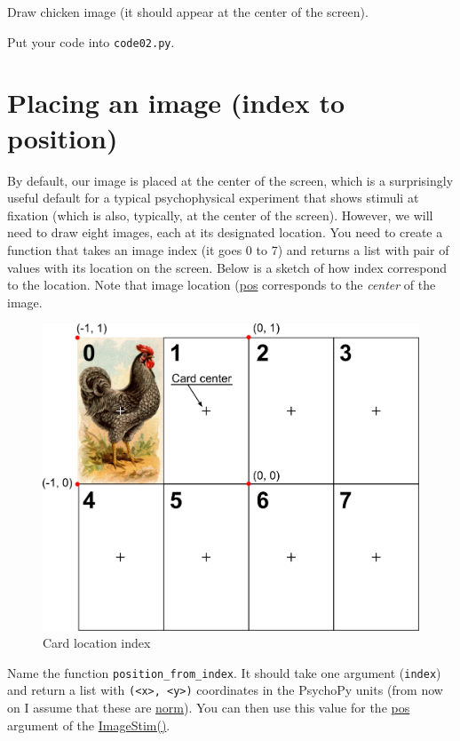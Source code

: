 \documentclass[
]{book}
\begin{document}
Draw chicken image (it should appear at the center of the screen).

Put your code into \texttt{code02.py}.

\hypertarget{placing-an-image-index-to-position}{%
\section{Placing an image (index to position)}\label{placing-an-image-index-to-position}}

By default, our image is placed at the center of the screen, which is a surprisingly useful default for a typical psychophysical experiment that shows stimuli at fixation (which is also, typically, at the center of the screen). However, we will need to draw eight images, each at its designated location. You need to create a function that takes an image index (it goes 0 to 7) and returns a list with pair of values with its location on the screen. Below is a sketch of how index correspond to the location. Note that image location (\href{https://psychopy.org/api/visual/imagestim.html\#psychopy.visual.ImageStim.pos\%20attribute}{pos} corresponds to the \emph{center} of the image.

\begin{figure}
\centering
\includegraphics[width=1\textwidth,height=\textheight]{images/memory-location-index.png}
\caption{Card location index}
\end{figure}

Name the function \texttt{position\_from\_index}. It should take one argument (\texttt{index}) and return a list with \texttt{(\textless{}x\textgreater{},\ \textless{}y\textgreater{})} coordinates in the PsychoPy units (from now on I assume that these are \protect\hyperlink{psychopy-units-norm}{norm}). You can then use this value for the \href{https://psychopy.org/api/visual/imagestim.html\#psychopy.visual.ImageStim.pos}{pos} argument of the \href{https://psychopy.org/api/visual/imagestim.html\#imagestim}{ImageStim()}.
\end{document}

